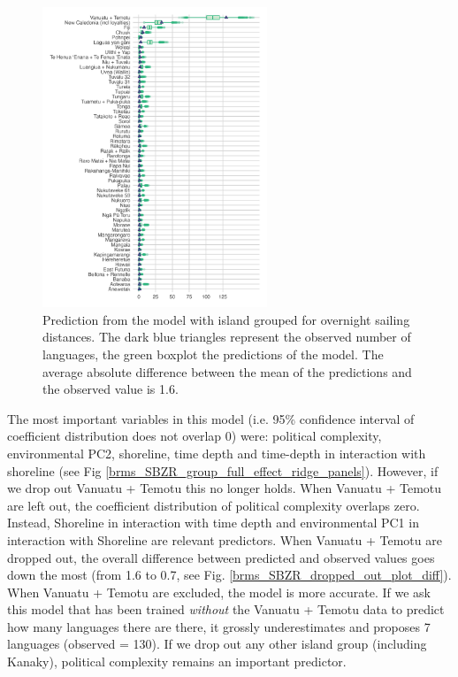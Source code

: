 \documentclass[unnumsec,webpdf,modern,medium]{oup-authoring-template}
\begin{document}
\begin{figure}[ht]
\centering
\includegraphics[width=0.6\textwidth]{latex/brms_predict_SBZR}
\caption{Prediction from the model with island grouped for overnight sailing distances. The dark blue triangles represent the observed number of languages, the green boxplot the predictions of the model. The average absolute difference between the mean of the predictions and the observed value is 1.6.}
\label{SBZR_model_predict}
\end{figure}


The most important variables in this model (i.e. 95\% confidence interval of coefficient distribution does not overlap 0) were: political complexity, environmental PC2, shoreline, time depth and time-depth in interaction with shoreline  (see Fig \ref{brms_SBZR_group_full_effect_ridge_panels}). However, if we drop out Vanuatu + Temotu this no longer holds. When Vanuatu + Temotu are left out, the coefficient distribution of political complexity overlaps zero. Instead,  Shoreline in interaction with time depth and environmental PC1 in interaction with Shoreline are relevant predictors. When Vanuatu + Temotu are dropped out, the overall difference between predicted and observed values goes down the most (from 1.6 to 0.7, see Fig. \ref{brms_SBZR_dropped_out_plot_diff}). When Vanuatu + Temotu are excluded, the model is more accurate. If we ask this model that has been trained \emph{without} the Vanuatu + Temotu data to predict how many languages there are there, it grossly underestimates and proposes 7 languages (observed = 130). If we drop out any other island group (including Kanaky), political complexity remains an important predictor.
\end{document}
